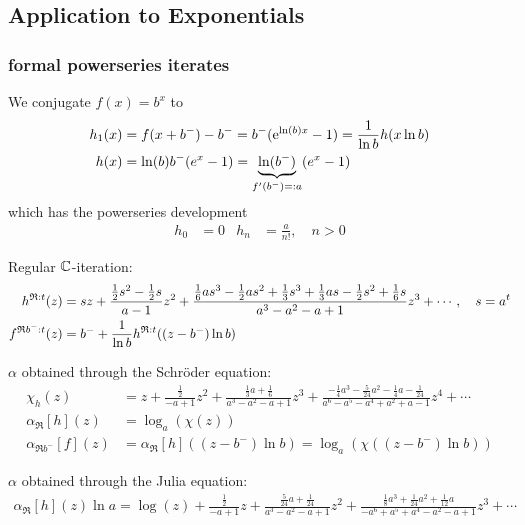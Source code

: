 \documentclass{article}
\numberwithin{equation}{section}
\begin{document}
\subsection{Application to Exponentials}
\subsubsection{formal powerseries iterates}
We conjugate $f(x)=b^x$ to 
\begin{align*}
  h_1(x)&=f(x+b^-)-b^-=b^-(\mathrm{e}^{\ln(b)x}-1)=\frac{1}{\ln b} h(x\ln b)\\
  h(x)&=\ln(b)b^-(e^x-1)=\underbrace{\ln(b^-)}_{f'(b^-)=:a}(e^x-1)
\end{align*}
which has the powerseries development 
\begin{align*}
  h_0 &= 0 & h_n &= \frac{a}{n!}, \quad n>0
\end{align*}

Regular $\mathbb{C}$-iteration:
\begin{align*}
{h}^{\mathfrak{R}:t}(z) &= sz+\frac{\frac{1}{2} s^{2} - \frac{1}{2} s}{a -
  1}z^2+\frac{\frac{1}{6} a s^{3} - \frac{1}{2} a s^{2} + \frac{1}{3}
  s^{3} + \frac{1}{3} a s - \frac{1}{2} s^{2} + \frac{1}{6} s}{a^{3} -
  a^{2} - a + 1}z^3+\dotsb,\quad s=a^t\\
{f}^{\mathfrak{R}b^-:t}(z) &= b^-+\frac{1}{\ln b}{h}^{\mathfrak{R}:t}((z-b^-)\ln
b)
\end{align*}

$\alpha$ obtained through the Schröder equation:
\begin{align*}
\chi_h(z)&=z+\frac{\frac{1}{2}}{-a + 1}z^2+\frac{\frac{1}{3} a +
  \frac{1}{6}}{a^{3} - a^{2} - a + 1}z^3+\frac{-\frac{1}{4} a^{3} -
  \frac{5}{24} a^{2} - \frac{1}{4} a - \frac{1}{24}}{a^{6} - a^{5} -
  a^{4} + a^{2} + a - 1}z^4 + \dotsb\\
\alpha_{\mathfrak{R}}[h](z)&=\log_a(\chi(z))\\
\alpha_{\mathfrak{R}b^-}[f](z)&=\alpha_{\mathfrak{R}}[h]((z-b^-)\ln
b)=\log_a(\chi((z-b^-)\ln b))
\end{align*}

$\alpha$ obtained through the Julia equation:
\begin{align*}
\alpha_{\mathfrak{R}}[h](z)\ln a= \log(z)+\frac{\frac{1}{2}}{-a +
  1}z+\frac{\frac{5}{24} a + \frac{1}{24}}{a^{3} - a^{2} - a +
  1}z^2+\frac{\frac{1}{8} a^{3} + \frac{1}{24} a^{2} + \frac{1}{12}
  a}{-a^{6} + a^{5} + a^{4} - a^{2} - a +
  1}z^3 +\dotsb
\end{align*}
\end{document}
